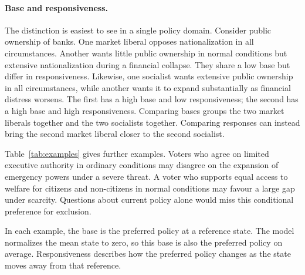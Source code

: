 \documentclass[12pt,letterpaper]{article}
\begin{document}
\paragraph{Base and responsiveness.}
The distinction is easiest to see in a single policy domain. Consider public ownership of banks. One market liberal opposes nationalization in all circumstances. Another wants little public ownership in normal conditions but extensive nationalization during a financial collapse. They share a low base but differ in responsiveness. Likewise, one socialist wants extensive public ownership in all circumstances, while another wants it to expand substantially as financial distress worsens. The first has a high base and low responsiveness; the second has a high base and high responsiveness. Comparing bases groups the two market liberals together and the two socialists together. Comparing responses can instead bring the second market liberal closer to the second socialist.

Table~\ref{tab:examples} gives further examples. Voters who agree on limited executive authority in ordinary conditions may disagree on the expansion of emergency powers under a severe threat. A voter who supports equal access to welfare for citizens and non-citizens in normal conditions may favour a large gap under scarcity. Questions about current policy alone would miss this conditional preference for exclusion.

In each example, the base is the preferred policy at a reference state. The model normalizes the mean state to zero, so this base is also the preferred policy on average. Responsiveness describes how the preferred policy changes as the state moves away from that reference.
\end{document}
